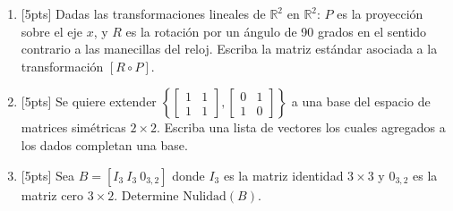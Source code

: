 \documentclass[11pt]{article}
\begin{document}
\begin{enumerate}
\begin{enumerate}
\vspace{4pt}

\item{}[5pts] Determine una base $\mathcal{B}_2$ para $\mathrm{Nul}(A)$.

\vspace{4pt}
\end{enumerate}

\item{}[5pts] Dadas las transformaciones lineales de $\mathbb{R}^2$ en $\mathbb{R}^2$: $P$ es la proyección sobre el eje $x$, y $R$ es la rotación por un ángulo de 90 grados en el sentido contrario a las manecillas del reloj. Escriba la matriz estándar asociada a la transformación $[R\circ P]$.

\vspace{4pt}
\fbox{\begin{minipage}[t][2.5cm]{\dimexpr\linewidth-2\fboxsep-2\fboxrule}
$[R\circ P] = $
\end{minipage}}

\item{}[5pts] Se quiere extender $\left\{\begin{bmatrix}1&1\\1&1\end{bmatrix},\begin{bmatrix}0&1\\1&0\end{bmatrix}\right\}$ a una base del espacio de matrices simétricas $2\times 2$. Escriba una lista de vectores los cuales agregados a los dados completan una base.

\vspace{4pt}
\fbox{\begin{minipage}[t][2.5cm]{\dimexpr\linewidth-2\fboxsep-2\fboxrule}
\phantom{x}
\end{minipage}}

\item{}[5pts] Sea $B=[I_3\ I_3\ 0_{3,2}]$ donde $I_3$ es la matriz identidad $3\times 3$ y $0_{3,2}$ es la matriz cero $3\times 2$. Determine $\mathrm{Nulidad}(B)$.

\vspace{4pt}


\end{enumerate}
\end{document}

